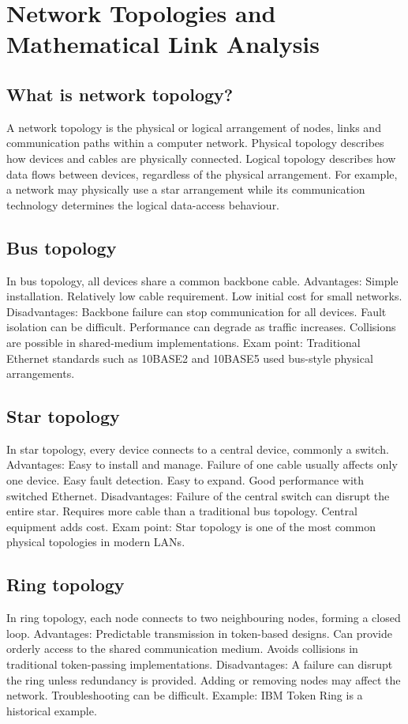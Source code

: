 \section{Network Topologies and Mathematical Link Analysis}

\subsection{What is network topology?}
A network topology is the physical or logical arrangement of nodes, links and communication paths within a computer network.
Physical topology describes how devices and cables are physically connected.
Logical topology describes how data flows between devices, regardless of the physical arrangement.
For example, a network may physically use a star arrangement while its communication technology determines the logical data-access behaviour.
\subsection{Bus topology}


In bus topology, all devices share a common backbone cable.
Advantages:
Simple installation.
Relatively low cable requirement.
Low initial cost for small networks.
Disadvantages:
Backbone failure can stop communication for all devices.
Fault isolation can be difficult.
Performance can degrade as traffic increases.
Collisions are possible in shared-medium implementations.
Exam point: Traditional Ethernet standards such as 10BASE2 and 10BASE5 used bus-style physical arrangements.
\subsection{Star topology}


In star topology, every device connects to a central device, commonly a switch.
Advantages:
Easy to install and manage.
Failure of one cable usually affects only one device.
Easy fault detection.
Easy to expand.
Good performance with switched Ethernet.
Disadvantages:
Failure of the central switch can disrupt the entire star.
Requires more cable than a traditional bus topology.
Central equipment adds cost.
Exam point: Star topology is one of the most common physical topologies in modern LANs.
\subsection{Ring topology}


In ring topology, each node connects to two neighbouring nodes, forming a closed loop.
Advantages:
Predictable transmission in token-based designs.
Can provide orderly access to the shared communication medium.
Avoids collisions in traditional token-passing implementations.
Disadvantages:
A failure can disrupt the ring unless redundancy is provided.
Adding or removing nodes may affect the network.
Troubleshooting can be difficult.
Example: IBM Token Ring is a historical example.
